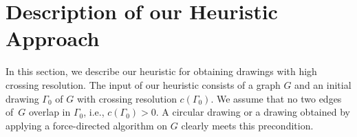 \documentclass[runningheads]{llncs}
\begin{document}
%
%
%
%



\section{Description of our Heuristic Approach}
\label{sec:algorithm}



In this section, we describe our heuristic for obtaining drawings with high crossing resolution. The input of our heuristic consists of a graph $G$ and an initial drawing $\Gamma_0$ of $G$ with crossing resolution $c(\Gamma_0)$. We assume that no two edges of~$G$ overlap in $\Gamma_0$, i.e., $c(\Gamma_0)>0$. A circular drawing or a drawing obtained by applying a force-directed algorithm on $G$ clearly meets this precondition.
\end{document}
